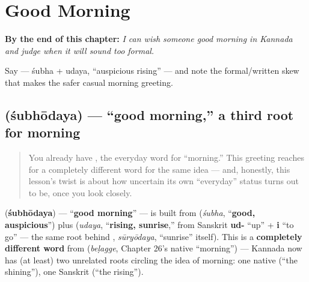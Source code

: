 
\chapter{Good Morning}
\label{ch:ka-good-morning}

\begin{chapteropening}
\textbf{By the end of this chapter:} \emph{I can wish someone good morning in Kannada and judge when it will sound too formal.}

Say  — śubha + udaya, \textquotedblleft{}auspicious rising\textquotedblright{} — and note the formal/written skew that makes  the safer casual morning greeting.
\end{chapteropening}

\section[\texorpdfstring{\kn{ಶುಭೋದಯ} (śubhōdaya)}{ಶುಭೋದಯ (śubhōdaya)}]{ (śubhōdaya) — \textquotedblleft{}good morning,\textquotedblright{} a third root for morning}

\label{lesson:KA-C29-shubhodaya}



\begin{quote}
You already have , the everyday word for \textquotedblleft{}morning.\textquotedblright{} This greeting reaches for a completely different word for the same idea — and, honestly, this lesson's twist is about how uncertain its own \textquotedblleft{}everyday\textquotedblright{} status turns out to be, once you look closely.
\end{quote}

\begin{cousinweb}
\textbf{} (\textbf{śubhōdaya}) — \textquotedblleft{}\textbf{good morning}\textquotedblright{} — is built from \textbf{} (\emph{śubha}, \textquotedblleft{}\textbf{good, auspicious}\textquotedblright{}) plus \textbf{} (\emph{udaya}, \textquotedblleft{}\textbf{rising, sunrise},\textquotedblright{} from Sanskrit \textbf{ud-} \textquotedblleft{}up\textquotedblright{} + \textbf{i} \textquotedblleft{}to go\textquotedblright{} — the same root behind \textbf{}, \emph{sūryōdaya}, \textquotedblleft{}sunrise\textquotedblright{} itself). This is a \textbf{completely different word} from \textbf{} (\emph{beḷagge}, Chapter 26's native \textquotedblleft{}morning\textquotedblright{}) — Kannada now has (at least) two unrelated roots circling the idea of morning: one native (\textquotedblleft{}the shining\textquotedblright{}), one Sanskrit (\textquotedblleft{}the rising\textquotedblright{}).
\end{cousinweb}

